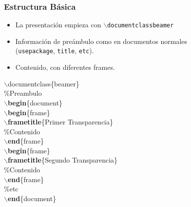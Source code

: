 \documentclass[aspectratio=1610]{beamer}%
\newcommand\azul[1]{\textcolor[RGB]{19,15,204}{#1}}
\newcommand\verde[1]{\textcolor[RGB]{52,178,51}{#1}}
\begin{document}
\begin{frame}[fragile]
\frametitle{\textbf{Estructura Básica}}
\justifying
 \begin{itemize}\justifying
  \item La presentación empieza con \texttt{$\backslash$documentclass{beamer}}
  \item Información de preámbulo como en documentos normales\\(\texttt{usepackage}, \texttt{title}, \texttt{etc}).
  \item Contenido, con diferentes frames.
\end{itemize}

\begin{block}{}\small
$\backslash$\azul{documentclass}\{beamer\}\\
\verde{\%Preambulo}\\
$\backslash$\textbf{begin}\{document\}\\
$\backslash$\textbf{begin}\{frame\}\\
$\backslash$\textbf{frametitle}\{Primer Transparencia\}\\
\verde{\%Contenido}\\
$\backslash$\textbf{end}\{frame\}\\
$\backslash$\textbf{begin}\{frame\}\\
$\backslash$\textbf{frametitle}\{Segundo Transparencia\}\\
\verde{\%Contenido}\\
$\backslash$\textbf{end}\{frame\}\\
\%etc\\
$\backslash$\textbf{end}\{document\}\\
\end{block}




\end{frame}
\end{document}
